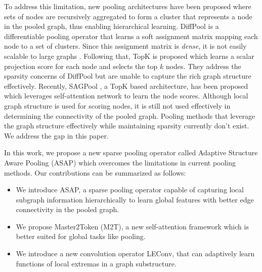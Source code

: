 \documentclass[letterpaper]{article} \usepackage{aaai20}  \usepackage{times}  \usepackage{helvet} \usepackage{courier}  \usepackage[hyphens]{url}  \usepackage{graphicx} \urlstyle{rm} \def\UrlFont{\rm}  \usepackage{graphicx}  \frenchspacing  \setlength{\pdfpagewidth}{8.5in}  \setlength{\pdfpageheight}{11in}
\begin{document}
To address this limitation, new pooling architectures have been proposed where sets of nodes are recursively aggregated to form a cluster that represents a node in the pooled graph, thus enabling hierarchical learning. DiffPool \cite{diffpool} is a differentiable pooling operator that learns a soft assignment matrix mapping each node to a set of clusters. Since this assignment matrix is \emph{dense}, it is not easily scalable to large graphs \cite{topk2}. Following that, TopK \cite{topk} is proposed which learns a scalar projection score for each node and selects the top $k$ nodes. They address the sparsity concerns of DiffPool but are unable to capture the rich graph structure effectively. Recently, SAGPool \cite{sag}, a TopK based architecture, has been proposed which leverages self-attention network to learn the node scores. Although local graph structure is used for scoring nodes, it is still not used effectively in determining the connectivity of the pooled graph. Pooling methods that leverage the graph structure effectively while maintaining sparsity currently don't exist. We address the gap in this paper.



In this work, we propose a new sparse pooling operator called Adaptive Structure Aware Pooling (ASAP) which overcomes the limitations in current pooling methods. Our contributions can be summarized as follows:
\begin{itemize}
	\item We introduce ASAP, a sparse pooling operator capable of capturing local subgraph information hierarchically to learn global features with better edge connectivity in the pooled graph.
	\item We propose Master2Token (M2T), a new self-attention framework which is better suited for global tasks like pooling.
	\item We introduce a new convolution operator LEConv, that can adaptively learn functions of local extremas in a graph substructure.
\end{itemize}



















 
\end{document}
